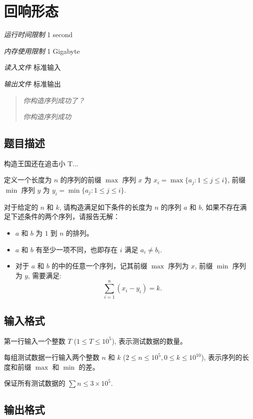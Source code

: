 \section[B. 回响形态]{ 回响形态}

\textit{运行时间限制}   1 second

\textit{内存使用限制} 1 Gigabyte

\textit{读入文件} \qquad 标准输入

\textit{输出文件} \qquad 标准输出


\begin{quote}
	\textit{你构造序列成功了？}

	\textit{你构造序列成功}
\end{quote}

\subsection{题目描述}

构造王国还在追击小 T...

定义一个长度为 $n$ 的序列的前缀 $\max$ 序列 $x$ 为 $x_i = \max\{a_j : 1 \le j \le i\}$, 前缀 $\min$ 序列 $y$ 为 $y_i = \min\{a_j : 1 \le j \le i\}$.

对于给定的 $n$ 和 $k$, 请构造满足如下条件的长度为 $n$ 的序列 $a$ 和 $b$, 如果不存在满足下述条件的两个序列，请报告无解：

\begin{itemize}
	\item $a$ 和 $b$ 为 $1$ 到 $n$ 的排列。
	\item $a$ 和 $b$ 有至少一项不同，也即存在 $i$ 满足 $a_i \ne b_i$.
	\item 对于 $a$ 和 $b$ 的中的任意一个序列，记其前缀 $\max$ 序列为 $x$, 前缀 $\min$ 序列为 $y$, 需要满足:
	\[
		\sum_{i=1}^n (x_i - y_i) = k.
	\]
\end{itemize}

\subsection{输入格式}

第一行输入一个整数 $T$ ($1 \le T \le 10^5$), 表示测试数据的数量。

每组测试数据一行输入两个整数 $n$ 和 $k$ ($2 \le n \le 10^5, 0 \le k \le 10^{10}$), 表示序列的长度和前缀 $\max$ 和 $\min$ 的差。

保证所有测试数据的 $\sum n \le 3 \times 10^5$.

\subsection{输出格式}

